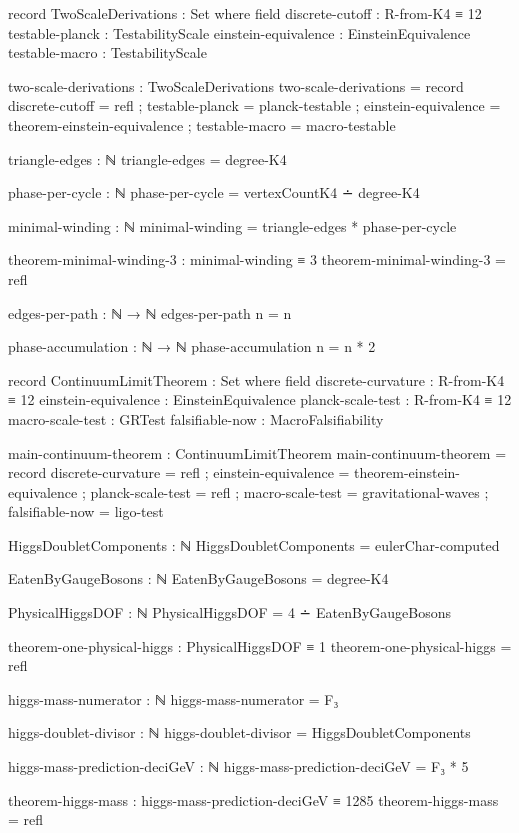 \documentclass[11pt,a4paper]{book}
\begin{document}
\begin{code}
record TwoScaleDerivations : Set where
  field
    discrete-cutoff : R-from-K4 ≡ 12
    testable-planck : TestabilityScale
    einstein-equivalence : EinsteinEquivalence
    testable-macro : TestabilityScale

two-scale-derivations : TwoScaleDerivations
two-scale-derivations = record
  { discrete-cutoff = refl
  ; testable-planck = planck-testable
  ; einstein-equivalence = theorem-einstein-equivalence
  ; testable-macro = macro-testable
  }

triangle-edges : ℕ
triangle-edges = degree-K4

phase-per-cycle : ℕ
phase-per-cycle = vertexCountK4 ∸ degree-K4

minimal-winding : ℕ
minimal-winding = triangle-edges * phase-per-cycle

theorem-minimal-winding-3 : minimal-winding ≡ 3
theorem-minimal-winding-3 = refl

edges-per-path : ℕ → ℕ
edges-per-path n = n

phase-accumulation : ℕ → ℕ
phase-accumulation n = n * 2

record ContinuumLimitTheorem : Set where
  field
    discrete-curvature : R-from-K4 ≡ 12
    einstein-equivalence : EinsteinEquivalence
    planck-scale-test : R-from-K4 ≡ 12
    macro-scale-test : GRTest
    falsifiable-now : MacroFalsifiability

main-continuum-theorem : ContinuumLimitTheorem
main-continuum-theorem = record
  { discrete-curvature = refl
  ; einstein-equivalence = theorem-einstein-equivalence
  ; planck-scale-test = refl
  ; macro-scale-test = gravitational-waves
  ; falsifiable-now = ligo-test
  }

HiggsDoubletComponents : ℕ
HiggsDoubletComponents = eulerChar-computed

EatenByGaugeBosons : ℕ
EatenByGaugeBosons = degree-K4

PhysicalHiggsDOF : ℕ
PhysicalHiggsDOF = 4 ∸ EatenByGaugeBosons

theorem-one-physical-higgs : PhysicalHiggsDOF ≡ 1
theorem-one-physical-higgs = refl

higgs-mass-numerator : ℕ
higgs-mass-numerator = F₃

higgs-doublet-divisor : ℕ
higgs-doublet-divisor = HiggsDoubletComponents

higgs-mass-prediction-deciGeV : ℕ
higgs-mass-prediction-deciGeV = F₃ * 5

theorem-higgs-mass : higgs-mass-prediction-deciGeV ≡ 1285
theorem-higgs-mass = refl


\end{code}
\end{document}

